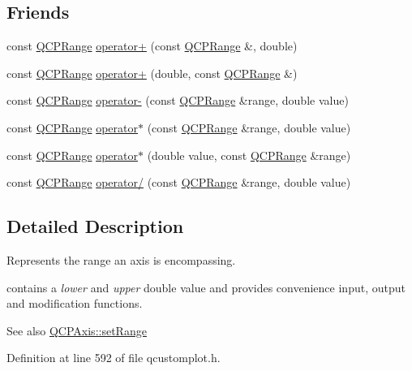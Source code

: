 \subsection*{Friends}
\begin{DoxyCompactItemize}
\item 
const \hyperlink{class_q_c_p_range}{Q\+C\+P\+Range} \hyperlink{class_q_c_p_range_af53ea6fb823a4a5897162b865841de04}{operator+} (const \hyperlink{class_q_c_p_range}{Q\+C\+P\+Range} \&, double)
\item 
const \hyperlink{class_q_c_p_range}{Q\+C\+P\+Range} \hyperlink{class_q_c_p_range_a9fb2e9941d32001482df670c0d704977}{operator+} (double, const \hyperlink{class_q_c_p_range}{Q\+C\+P\+Range} \&)
\item 
const \hyperlink{class_q_c_p_range}{Q\+C\+P\+Range} \hyperlink{class_q_c_p_range_a797f82830b516646da8873f82e39e356}{operator-\/} (const \hyperlink{class_q_c_p_range}{Q\+C\+P\+Range} \&range, double value)
\item 
const \hyperlink{class_q_c_p_range}{Q\+C\+P\+Range} \hyperlink{class_q_c_p_range_a558b1248ff6a9e41fd5b2630555a8acc}{operator$\ast$} (const \hyperlink{class_q_c_p_range}{Q\+C\+P\+Range} \&range, double value)
\item 
const \hyperlink{class_q_c_p_range}{Q\+C\+P\+Range} \hyperlink{class_q_c_p_range_a5cb2332f6957021f47cc768089f4f090}{operator$\ast$} (double value, const \hyperlink{class_q_c_p_range}{Q\+C\+P\+Range} \&range)
\item 
const \hyperlink{class_q_c_p_range}{Q\+C\+P\+Range} \hyperlink{class_q_c_p_range_a4b366a3a21974c88e09b0d39d4a24a4b}{operator/} (const \hyperlink{class_q_c_p_range}{Q\+C\+P\+Range} \&range, double value)
\end{DoxyCompactItemize}


\subsection{Detailed Description}
Represents the range an axis is encompassing. 

contains a {\itshape lower} and {\itshape upper} double value and provides convenience input, output and modification functions.

\begin{DoxySeeAlso}{See also}
\hyperlink{class_q_c_p_axis_aebdfea5d44c3a0ad2b4700cd4d25b641}{Q\+C\+P\+Axis\+::set\+Range} 
\end{DoxySeeAlso}


Definition at line 592 of file qcustomplot.\+h.



